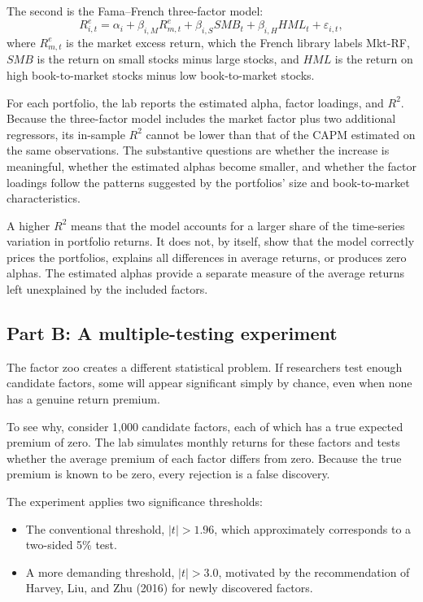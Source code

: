 The second is the Fama--French three-factor model:
\begin{equation}
  R^{e}_{i,t}
  = \alpha_i+\beta_{i,M}R^{e}_{m,t}
  +\beta_{i,S}SMB_t
  +\beta_{i,H}HML_t+\varepsilon_{i,t},
  \label{eq:03-lab-ff3}
\end{equation}
where $R^{e}_{m,t}$ is the market excess return, which the French library labels Mkt-RF, $SMB$ is the return on small stocks minus large stocks, and $HML$ is the return on high book-to-market stocks minus low book-to-market stocks.

For each portfolio, the lab reports the estimated alpha, factor loadings, and $R^2$. Because the three-factor model includes the market factor plus two additional regressors, its in-sample $R^2$ cannot be lower than that of the CAPM estimated on the same observations. The substantive questions are whether the increase is meaningful, whether the estimated alphas become smaller, and whether the factor loadings follow the patterns suggested by the portfolios' size and book-to-market characteristics.

A higher $R^2$ means that the model accounts for a larger share of the time-series variation in portfolio returns. It does not, by itself, show that the model correctly prices the portfolios, explains all differences in average returns, or produces zero alphas. The estimated alphas provide a separate measure of the average returns left unexplained by the included factors.

\subsection*{Part B: A multiple-testing experiment}

The factor zoo creates a different statistical problem. If researchers test enough candidate factors, some will appear significant simply by chance, even when none has a genuine return premium.

To see why, consider 1,000 candidate factors, each of which has a true expected premium of zero. The lab simulates monthly returns for these factors and tests whether the average premium of each factor differs from zero. Because the true premium is known to be zero, every rejection is a false discovery.

The experiment applies two significance thresholds:
\begin{itemize}
  \item The conventional threshold, $|t|>1.96$, which approximately corresponds to a two-sided 5\% test.
  \item A more demanding threshold, $|t|>3.0$, motivated by the recommendation of Harvey, Liu, and Zhu (2016) for newly discovered factors.
\end{itemize}

